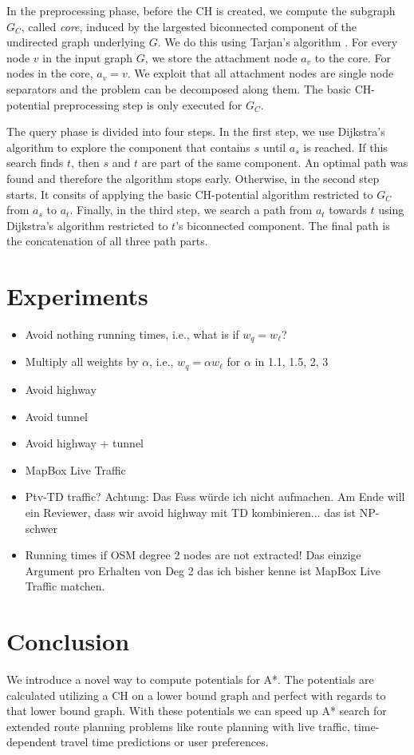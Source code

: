 \documentclass[a4paper,UKenglish,cleveref, autoref]{lipics-v2019}
\begin{document}
In the preprocessing phase, before the CH is created, we compute the subgraph $G_C$, called \emph{core}, induced by the largested biconnected component of the undirected graph underlying $G$.
We do this using Tarjan's algorithm \cite{Tarjan's algorithm}.
For every node $v$ in the input graph $G$, we store the attachment node $a_v$ to the core.
For nodes in the core, $a_v=v$.
We exploit that all attachment nodes are single node separators and the problem can be decomposed along them.
The basic CH-potential preprocessing step is only executed for $G_C$.

The query phase is divided into four steps.
In the first step, we use Dijkstra's algorithm to explore the component that contains $s$ until $a_s$ is reached.
If this search finds $t$, then $s$ and $t$ are part of the same component.
An optimal path was found and therefore the algorithm stops early.
Otherwise, in the second step starts.
It consits of applying the basic CH-potential algorithm restricted to $G_C$ from $a_s$ to $a_t$.
Finally, in the third step, we search a path from $a_t$ towards $t$ using Dijkstra's algorithm restricted to $t$'s biconnected component.
The final path is the concatenation of all three path parts.

\section{Experiments}

\begin{itemize}
\item Avoid nothing running times, i.e., what is if $w_q = w_\ell$?
\item Multiply all weights by $\alpha$, i.e., $w_q = \alpha w_\ell$ for $\alpha$ in 1.1, 1.5, 2, 3
\item Avoid highway
\item Avoid tunnel
\item Avoid highway + tunnel
\item MapBox Live Traffic
\item Ptv-TD traffic? Achtung: Das Fass würde ich nicht aufmachen. Am Ende will ein Reviewer, dass wir avoid highway mit TD kombinieren... das ist NP-schwer
\item Running times if OSM degree 2 nodes are not extracted! Das einzige Argument pro Erhalten von Deg 2 das ich bisher kenne ist MapBox Live Traffic matchen.
\end{itemize}


\section{Conclusion}
\label{sec:conclusion}

We introduce a novel way to compute potentials for A*.
The potentials are calculated utilizing a CH on a lower bound graph and perfect with regards to that lower bound graph.
With these potentials we can speed up A* search for extended route planning problems like route planning with live traffic, time-dependent travel time predictions or user preferences.





\end{document}
